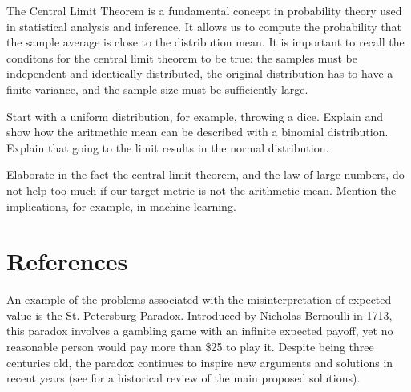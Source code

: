 The Central Limit Theorem is a fundamental concept in probability theory used in statistical analysis and inference. It allows us to compute the probability that the sample average is close to the distribution mean. It is important to recall the conditons for the central limit theorem to be true: the samples must be independent and identically distributed, the original distribution has to have a finite variance, and the sample size must be sufficiently large.

\begin{example}
{\color{red} Start with a uniform distribution, for example, throwing a dice. Explain and show how the aritmethic mean can be described with a binomial distribution. Explain that going to the limit results in the normal distribution.}
\end{example}

{\color{red} Elaborate in the fact the central limit theorem, and the law of large numbers, do not help too much if our target metric is not the arithmetic mean. Mention the implications, for example, in machine learning.}

%
%
\section*{References}

An example of the problems associated with the misinterpretation of expected value is the St. Petersburg Paradox. Introduced by Nicholas Bernoulli in 1713, this paradox involves a gambling game with an infinite expected payoff, yet no reasonable person would pay more than \$25 to play it. Despite being three centuries old, the paradox continues to inspire new arguments and solutions in recent years (see \cite{huang2013three} for a historical review of the main proposed solutions).




